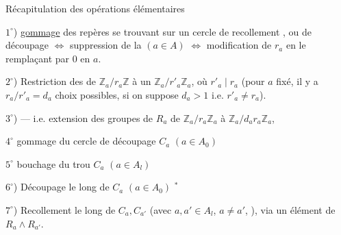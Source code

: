 
Récapitulation des opérations élémentaires


$1^\circ$) \uline{gommage}  des repères se trouvant sur un cercle de recollement , ou  de découpage
$\Longleftrightarrow$ suppression de la  
$(a\in A)$ $\Longleftrightarrow$ modification de $r_a$ en le
remplaçant par $0$ en $a$.

$2^\circ$) 
Restriction des   de $\mathbb Z_a/r_a\mathbb Z$ à un
$\mathbb Z_a/r'_a\mathbb Z_a$, où $r'_a\mid r_a$
(pour $a$ fixé, il y a $r_a/r'_a=d_a$ choix possibles, si on suppose $d_a>1$ i.e. $r'_a\ne r_a$).

$3^\circ$) 
--- i.e. extension des groupes de $R_a$ de
$\mathbb Z_a/r_a\mathbb Z_a$ à $\mathbb Z_a/d_ar_a\mathbb Z_a$,

\textcircled{$4^\circ$} gommage du cercle de découpage $C_a$ $(a\in A_0)$

\textcircled{$5^\circ$} bouchage du trou $C_a$ $(a\in A_l)$

$6^\circ$) Découpage le long de $C_a$ $(a\in A_0)$ \({}^*\)

$7^\circ$) Recollement le long de $C_a,C_{a'}$
(avec $a,a'\in A_l$, $a\ne a'$, ), via un élément de
$R_a\mathbin{\wedge}R_{a'}$.

